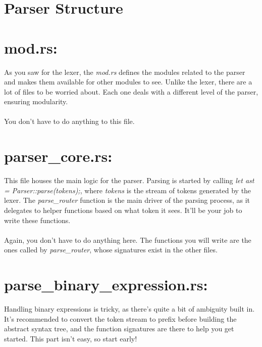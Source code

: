 \documentclass[
	12pt, %
]{fphw}
\begin{document}
\section*{Parser Structure}




\section*{mod.rs:}
As you saw for the lexer, the \textit{mod.rs} defines the modules related to the parser and makes them available for other modules to see. Unlike the lexer, there are a lot of files to be worried about. Each one deals with a different level of the parser, ensuring modularity.\\
\\
You don't have to do anything to this file.

\section*{parser\_core.rs:}
This file houses the main logic for the parser. Parsing is started by calling \textit{let ast = Parser::parse(tokens);}, where \textit{tokens} is the stream of tokens generated by the lexer. The \textit{parse\_router} function is the main driver of the parsing process, as it delegates to helper functions based on what token it sees. It'll be your job to write these functions. \\
\\
Again, you don't have to do anything here. The functions you will write are the ones called by \textit{parse\_router}, whose signatures exist in the other files.

\section*{parse\_binary\_expression.rs:}
Handling binary expressions is tricky, as there's quite a bit of ambiguity built in. It's recommended to convert the token stream to prefix before building the abstract syntax tree, and the function signatures are there to help you get started. This part isn't easy, so start early! 
\end{document}

